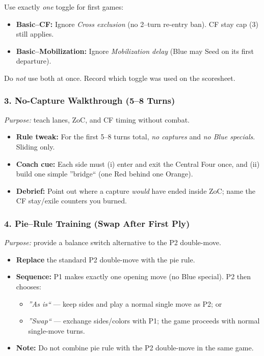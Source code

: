 \documentclass[11pt]{article}
\begin{document}
\begin{rulevariant}[title={Basic Mode (Teaching Toggles)}]
Use exactly \emph{one} toggle for first games:
\begin{itemize}\itemsep0.2em
  \item \textbf{Basic--CF:} Ignore \emph{Cross exclusion} (no 2--turn re-entry ban). CF stay cap (3) still applies.
  \item \textbf{Basic--Mobilization:} Ignore \emph{Mobilization delay} (Blue may Seed on its first departure).
\end{itemize}
Do \emph{not} use both at once. Record which toggle was used on the scoresheet.
\end{rulevariant}

\subsubsection*{3. No-Capture Walkthrough (5--8 Turns)}
\textit{Purpose:} teach lanes, ZoC, and CF timing without combat.
\begin{itemize}[leftmargin=1.3em]
  \item \textbf{Rule tweak:} For the first 5--8 turns total, \emph{no captures} and \emph{no Blue specials}. Sliding only.
  \item \textbf{Coach cue:} Each side must (i) enter and exit the Central Four once, and (ii) build one simple ''bridge`` (one Red behind one Orange).
  \item \textbf{Debrief:} Point out where a capture \emph{would} have ended inside ZoC; name the CF stay/exile counters you burned.
\end{itemize}

\subsubsection*{4. Pie--Rule Training (Swap After First Ply)}
\textit{Purpose:} provide a balance switch alternative to the P2 double-move.
\begin{itemize}[leftmargin=1.3em]
  \item \textbf{Replace} the standard P2 double-move with the pie rule.
  \item \textbf{Sequence:} P1 makes exactly one opening move (no Blue special). P2 then chooses:
    \begin{itemize}
      \item \emph{''As is``} --- keep sides and play a normal single move as P2; or
      \item \emph{''Swap``} --- exchange sides/colors with P1; the game proceeds with normal single-move turns.
    \end{itemize}
  \item \textbf{Note:} Do not combine pie rule with the P2 double-move in the same game.
\end{itemize}
\end{document}
